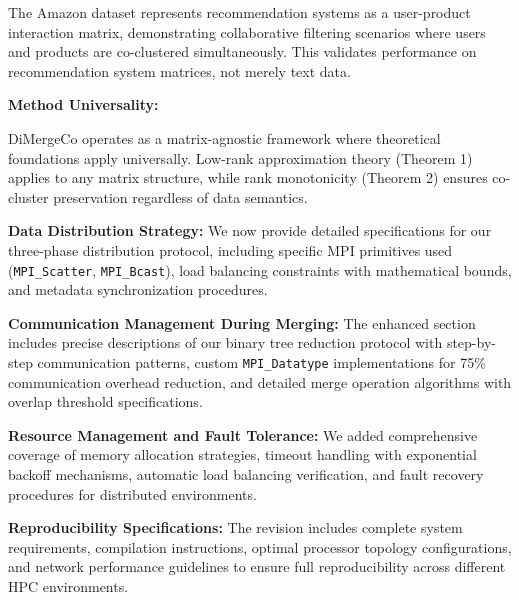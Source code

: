 \documentclass{ar2rc}
\begin{document}
The Amazon dataset represents recommendation systems as a user-product interaction matrix, demonstrating collaborative filtering scenarios where users and products are co-clustered simultaneously. This validates performance on recommendation system matrices, not merely text data.

\textbf{Method Universality:}

DiMergeCo operates as a matrix-agnostic framework where theoretical foundations apply universally. Low-rank approximation theory (Theorem 1) applies to any matrix structure, while rank monotonicity (Theorem 2) ensures co-cluster preservation regardless of data semantics.



\textbf{Data Distribution Strategy:}
We now provide detailed specifications for our three-phase distribution protocol, including specific MPI primitives used (\texttt{MPI\_Scatter}, \texttt{MPI\_Bcast}), load balancing constraints with mathematical bounds, and metadata synchronization procedures.

\textbf{Communication Management During Merging:}
The enhanced section includes precise descriptions of our binary tree reduction protocol with step-by-step communication patterns, custom \texttt{MPI\_Datatype} implementations for 75\% communication overhead reduction, and detailed merge operation algorithms with overlap threshold specifications.

\textbf{Resource Management and Fault Tolerance:}
We added comprehensive coverage of memory allocation strategies, timeout handling with exponential backoff mechanisms, automatic load balancing verification, and fault recovery procedures for distributed environments.

\textbf{Reproducibility Specifications:}
The revision includes complete system requirements, compilation instructions, optimal processor topology configurations, and network performance guidelines to ensure full reproducibility across different HPC environments.
\end{document}
